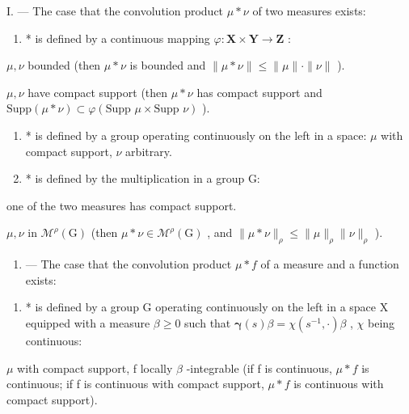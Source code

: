
I. --- The case that the convolution product \(\mu * \nu\) of two measures exists:

\begin{enumerate}
\def\labelenumi{(\alph{enumi})}
\tightlist
\item
  * is defined by a continuous mapping \(\varphi : \mathbf{X} \times \mathbf{Y} \to \mathbf{Z}\) :
\end{enumerate}

\(\mu, \nu\) bounded (then \(\mu * \nu\) is bounded and \(\| \mu * \nu \| \leqslant \| \mu \| \cdot \| \nu \|\) ).

\(\mu, \nu\) have compact support (then \(\mu * \nu\) has compact support and \(\text{Supp}(\mu * \nu) \subset \varphi(\text{Supp } \mu \times \text{Supp } \nu)\) ).

\begin{enumerate}
\def\labelenumi{(\alph{enumi})}
\setcounter{enumi}{1}
\item
  * is defined by a group operating continuously on the left in a space: \(\mu\) with compact support, \(\nu\) arbitrary.
\item
  * is defined by the multiplication in a group G:
\end{enumerate}

one of the two measures has compact support.

\(\mu, \nu\) in \(\mathcal{M}^{\rho}(\mathrm{G})\) (then \(\mu * \nu \in \mathcal{M}^{\rho}(\mathrm{G})\) , and \(\| \mu * \nu \|_{\rho} \leqslant \| \mu \|_{\rho} \| \nu \|_{\rho}\) ).

\begin{enumerate}
\def\labelenumi{\Roman{enumi}.}
\setcounter{enumi}{1}
\tightlist
\item
  --- The case that the convolution product \(\mu*f\) of a measure and a function exists:
\end{enumerate}

\begin{enumerate}
\def\labelenumi{(\alph{enumi})}
\tightlist
\item
  * is defined by a group G operating continuously on the left in a space X equipped with a measure \(\beta \geqslant 0\) such that \(\pmb{\gamma}(s)\beta = \chi(s^{-1},\cdot)\beta\) , \(\chi\) being continuous:
\end{enumerate}

\(\mu\) with compact support, f locally \(\beta\) -integrable (if f is continuous, \(\mu * f\) is continuous; if f is continuous with compact support, \(\mu * f\) is continuous with compact support).

